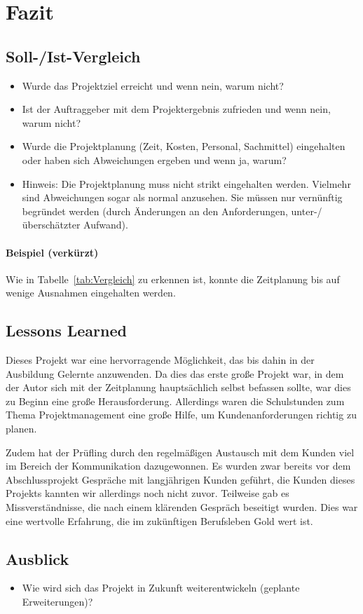 \section{Fazit} 
\label{sec:Fazit}

\subsection{Soll-/Ist-Vergleich}
\label{sec:SollIstVergleich}

\begin{itemize}
	\item Wurde das Projektziel erreicht und wenn nein, warum nicht?
	\item Ist der Auftraggeber mit dem Projektergebnis zufrieden und wenn nein, warum nicht?
	\item Wurde die Projektplanung (Zeit, Kosten, Personal, Sachmittel) eingehalten oder haben sich Abweichungen ergeben und wenn ja, warum?
	\item Hinweis: Die Projektplanung muss nicht strikt eingehalten werden. Vielmehr sind Abweichungen sogar als normal anzusehen. Sie müssen nur vernünftig begründet werden (\zB durch Änderungen an den Anforderungen, unter-/überschätzter Aufwand).
\end{itemize}

\paragraph{Beispiel (verkürzt)}
Wie in Tabelle~\ref{tab:Vergleich} zu erkennen ist, konnte die Zeitplanung bis auf wenige Ausnahmen eingehalten werden.


\subsection{Lessons Learned}
\label{sec:LessonsLearned}

Dieses Projekt war eine hervorragende Möglichkeit, das bis dahin in der Ausbildung Gelernte anzuwenden.
Da dies das erste große Projekt war, in dem der Autor sich mit der Zeitplanung hauptsächlich selbst befassen sollte, war dies zu Beginn eine große Herausforderung.
Allerdings waren die Schulstunden zum Thema Projektmanagement eine große Hilfe, um Kundenanforderungen richtig zu planen.

Zudem hat der Prüfling durch den regelmäßigen Austausch mit dem Kunden viel im Bereich der Kommunikation dazugewonnen.
Es wurden zwar bereits vor dem Abschlussprojekt Gespräche mit langjährigen Kunden geführt, die Kunden dieses Projekts kannten wir allerdings noch nicht zuvor.
Teilweise gab es Missverständnisse, die nach einem klärenden Gespräch beseitigt wurden.
Dies war eine wertvolle Erfahrung, die im zukünftigen Berufsleben Gold wert ist.

\subsection{Ausblick}
\label{sec:Ausblick}

\begin{itemize}
	\item Wie wird sich das Projekt in Zukunft weiterentwickeln (\zB geplante Erweiterungen)?
\end{itemize}
